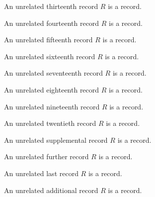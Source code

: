\begin{struct}\label{unrelated_record_12}
    An unrelated thirteenth record $R$ is a record.
\end{struct}

\begin{struct}\label{unrelated_record_13}
    An unrelated fourteenth record $R$ is a record.
\end{struct}

\begin{struct}\label{unrelated_record_14}
    An unrelated fifteenth record $R$ is a record.
\end{struct}

\begin{struct}\label{unrelated_record_15}
    An unrelated sixteenth record $R$ is a record.
\end{struct}

\begin{struct}\label{unrelated_record_16}
    An unrelated seventeenth record $R$ is a record.
\end{struct}

\begin{struct}\label{unrelated_record_17}
    An unrelated eighteenth record $R$ is a record.
\end{struct}

\begin{struct}\label{unrelated_record_18}
    An unrelated nineteenth record $R$ is a record.
\end{struct}

\begin{struct}\label{unrelated_record_19}
    An unrelated twentieth record $R$ is a record.
\end{struct}

\begin{struct}\label{unrelated_record_20}
    An unrelated supplemental record $R$ is a record.
\end{struct}

\begin{struct}\label{unrelated_record_21}
    An unrelated further record $R$ is a record.
\end{struct}

\begin{struct}\label{unrelated_record_22}
    An unrelated last record $R$ is a record.
\end{struct}

\begin{struct}\label{unrelated_record_23}
    An unrelated additional record $R$ is a record.
\end{struct}

